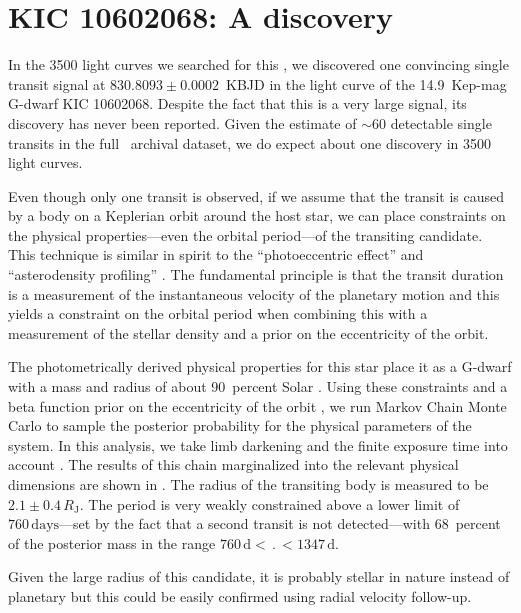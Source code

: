 \section{KIC 10602068: A discovery}

In the 3500 light curves we searched for this \paper, we discovered one
convincing single transit signal at $830.8093\pm0.0002$~KBJD in the light
curve of the 14.9~Kep-mag G-dwarf KIC 10602068.
Despite the fact that this is a very large signal, its discovery has never
been reported.
Given the estimate of $\sim 60$ detectable single transits in the full
\kepler\ archival dataset, we do expect about one discovery in 3500 light
curves.

Even though only one transit is observed, if we assume that the transit is
caused by a body on a Keplerian orbit around the host star, we can place
constraints on the physical properties---even the orbital period---of the
transiting candidate.
This technique is similar in spirit to the ``photoeccentric effect''
\citep{Dawson:2012} and ``asterodensity profiling'' \citep{Kipping:2012}.
The fundamental principle is that the transit duration is a measurement of
the instantaneous velocity of the planetary motion and this yields a
constraint on the orbital period when combining this with a measurement of the
stellar density and a prior on the eccentricity of the orbit.

The photometrically derived physical properties for this star place it as a
G-dwarf with a mass and radius of about 90~percent Solar \citep{Huber:2014}.
Using these constraints and a beta function prior on the eccentricity of the
orbit \citep{Kipping:2013a}, we run Markov Chain Monte Carlo
\citep{Foreman-Mackey:2013} to sample the posterior probability for the
physical parameters of the system.
In this analysis, we take limb darkening and the finite exposure time into
account \citep{Mandel:2002, Kipping:2010, Kipping:2013}.
The results of this chain marginalized into the relevant physical dimensions
are shown in .
The radius of the transiting body is measured to be $2.1 \pm
0.4\,R_\mathrm{J}$.
The period is very weakly constrained above a lower limit of
$760\,\mathrm{days}$---set by the fact that a second transit is not
detected---with 68~percent of the posterior mass in the range $760\,\mathrm{d}
< \period < 1347\,\mathrm{d}$.

Given the large radius of this candidate, it is probably stellar in nature
instead of planetary but this could be easily confirmed using radial velocity
follow-up.

